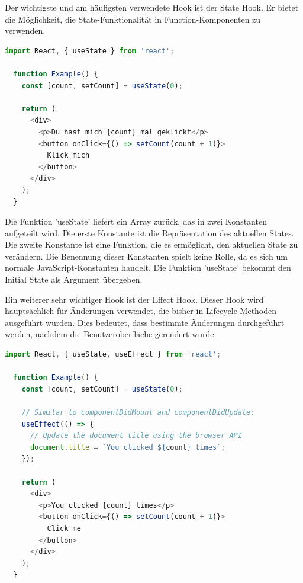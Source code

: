 Der wichtigste und am häufigsten verwendete Hook ist der State Hook. Er bietet die Möglichkeit, die State-Funktionalität in Function-Komponenten zu verwenden.

\cite{hooks}

\newpage

\begin{lstlisting}[language=JavaScript, caption=Code-Beispiel für Nutzung des State Hooks, label=lst:impl:stateHook]
  import React, { useState } from 'react';

  function Example() {
    const [count, setCount] = useState(0);

    return (
      <div>
        <p>Du hast mich {count} mal geklickt</p>
        <button onClick={() => setCount(count + 1)}>
          Klick mich
        </button>
      </div>
    );
  }
\end{lstlisting} \cite{hooks}

Die Funktion 'useState' liefert ein Array zurück, das in zwei Konstanten aufgeteilt wird. Die erste Konstante ist die Repräsentation des aktuellen States. Die zweite Konstante ist eine Funktion, die es ermöglicht, den aktuellen State zu verändern. Die Benennung dieser Konstanten spielt keine Rolle, da es sich um normale JavaScript-Konstanten handelt. Die Funktion 'useState' bekommt den Initial State als Argument übergeben.

Ein weiterer sehr wichtiger Hook ist der Effect Hook. Dieser Hook wird hauptsächlich für Änderungen verwendet, die bisher in Lifecycle-Methoden ausgeführt wurden. Dies bedeutet, dass bestimmte Änderungen durchgeführt werden, nachdem die Benutzeroberfläche gerendert wurde.
\cite{hooks}

\begin{lstlisting}[language=JavaScript, caption=Code-Beispiel für Nutzung des Effect Hooks, label=lst:impl:effectHook]
  import React, { useState, useEffect } from 'react';

  function Example() {
    const [count, setCount] = useState(0);
  
    // Similar to componentDidMount and componentDidUpdate:
    useEffect(() => {
      // Update the document title using the browser API
      document.title = `You clicked ${count} times`;
    });
  
    return (
      <div>
        <p>You clicked {count} times</p>
        <button onClick={() => setCount(count + 1)}>
          Click me
        </button>
      </div>
    );
  }
\end{lstlisting} \cite{hooks2}

